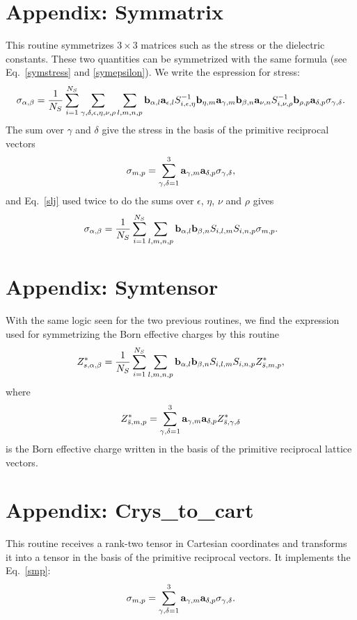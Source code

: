 \documentclass[12pt,a4paper,twoside]{report}
\begin{document}
\section{Appendix: Symmatrix}
This routine symmetrizes $3\times 3$ matrices such as the stress or the dielectric constants. These two quantities can be symmetrized with the same formula
(see Eq.~\ref{symstress} and \ref{symepsilon}).
We write the espression for stress:
\begin{equation}
\sigma_{\alpha,\beta}={1 \over N_S} \sum_{i=1}^{N_S}
\sum_{\gamma, \delta, \epsilon, \eta, \nu, \rho} \sum_{l, m, n, p} {\bf b}_{\alpha,l} {\bf a}_{\epsilon,l} S^{-1}_{i,\epsilon,\eta} {\bf b}_{\eta,m} {\bf a}_{\gamma,m} {\bf b}_{\beta,n} {\bf a}_{\nu,n} S^{-1}_{i,\nu,\rho} {\bf b}_{\rho,p} {\bf a}_{\delta,p} \sigma_{\gamma,\delta}.
\end{equation}
The sum over $\gamma$ and $\delta$ give the stress in the basis of the primitive reciprocal vectors
\begin{equation}
\sigma_{m,p}=\sum_{\gamma, \delta=1}^3
{\bf a}_{\gamma,m} {\bf a}_{\delta,p} \sigma_{\gamma,\delta},
\label{smp}
\end{equation}
and Eq.~\ref{slj} used twice to do the sums over $\epsilon$, $\eta$, $\nu$ and $\rho$ gives
\begin{equation}
\sigma_{\alpha,\beta}={1 \over N_S} \sum_{i=1}^{N_S}
 \sum_{l, m, n, p} {\bf b}_{\alpha,l} {\bf b}_{\beta,n}S_{i,l,m} S_{i,n,p} \sigma_{m,p}.
\end{equation}

\section{Appendix: Symtensor}
With the same logic seen for the two previous routines, 
we find the expression used for symmetrizing the
Born effective charges by this routine
\begin{equation}
Z^*_{s,\alpha,\beta}={1 \over N_S} \sum_{i=1}^{N_S}
 \sum_{l, m, n, p} {\bf b}_{\alpha,l} {\bf b}_{\beta,n}S_{i,l,m} S_{i,n,p} Z^*_{\bar s,m,p},
\end{equation}
where 
\begin{equation}
Z^*_{\bar s,m,p} = \sum_{\gamma, \delta=1}^3 {\bf a}_{\gamma,m} {\bf a}_{\delta,p} Z^*_{\bar s,\gamma,\delta}
\end{equation}
is the Born effective charge written in the basis of the primitive reciprocal lattice vectors.

\section{Appendix: Crys\_to\_cart}
This routine receives a rank-two tensor in Cartesian coordinates and transforms it into a tensor in the basis of the primitive reciprocal vectors. It implements the Eq.~\ref{smp}:
\begin{equation}
\sigma_{m,p}=\sum_{\gamma, \delta=1}^3
{\bf a}_{\gamma,m} {\bf a}_{\delta,p} \sigma_{\gamma,\delta}.
\end{equation}
\end{document}
